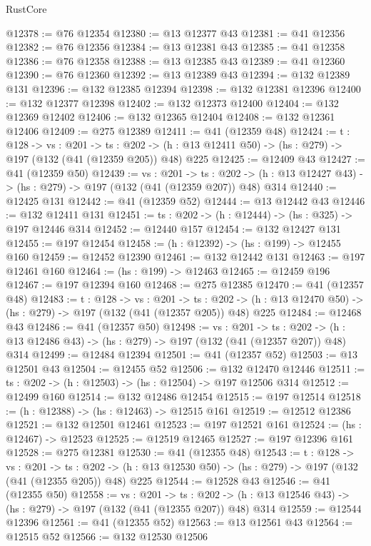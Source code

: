 \begin{lexlean}{RustCore}
\begin{coremodule}
@12378 := @76 @12354
@12380 := @13 @12377 @43
@12381 := @41 @12356
@12382 := @76 @12356
@12384 := @13 @12381 @43
@12385 := @41 @12358
@12386 := @76 @12358
@12388 := @13 @12385 @43
@12389 := @41 @12360
@12390 := @76 @12360
@12392 := @13 @12389 @43
@12394 := @132 @12389 @131
@12396 := @132 @12385 @12394
@12398 := @132 @12381 @12396
@12400 := @132 @12377 @12398
@12402 := @132 @12373 @12400
@12404 := @132 @12369 @12402
@12406 := @132 @12365 @12404
@12408 := @132 @12361 @12406
@12409 := @275 @12389
@12411 := @41 (@12359 @48)
@12424 := {t : @128} ->
  {vs : @201} ->
  {ts : @202} -> (h : @13 @12411 @50) -> (hs : @279) -> @197 (@132 (@41 (@12359 @205)) @48) @225
@12425 := @12409 @43
@12427 := @41 (@12359 @50)
@12439 := {vs : @201} ->
  {ts : @202} -> (h : @13 @12427 @43) -> (hs : @279) -> @197 (@132 (@41 (@12359 @207)) @48) @314
@12440 := @12425 @131
@12442 := @41 (@12359 @52)
@12444 := @13 @12442 @43
@12446 := @132 @12411 @131
@12451 := {ts : @202} -> (h : @12444) -> (hs : @325) -> @197 @12446 @314
@12452 := @12440 @157
@12454 := @132 @12427 @131
@12455 := @197 @12454
@12458 := (h : @12392) -> (hs : @199) -> @12455 @160
@12459 := @12452 @12390
@12461 := @132 @12442 @131
@12463 := @197 @12461 @160
@12464 := (hs : @199) -> @12463
@12465 := @12459 @196
@12467 := @197 @12394 @160
@12468 := @275 @12385
@12470 := @41 (@12357 @48)
@12483 := {t : @128} ->
  {vs : @201} ->
  {ts : @202} -> (h : @13 @12470 @50) -> (hs : @279) -> @197 (@132 (@41 (@12357 @205)) @48) @225
@12484 := @12468 @43
@12486 := @41 (@12357 @50)
@12498 := {vs : @201} ->
  {ts : @202} -> (h : @13 @12486 @43) -> (hs : @279) -> @197 (@132 (@41 (@12357 @207)) @48) @314
@12499 := @12484 @12394
@12501 := @41 (@12357 @52)
@12503 := @13 @12501 @43
@12504 := @12455 @52
@12506 := @132 @12470 @12446
@12511 := {ts : @202} -> (h : @12503) -> (hs : @12504) -> @197 @12506 @314
@12512 := @12499 @160
@12514 := @132 @12486 @12454
@12515 := @197 @12514
@12518 := (h : @12388) -> (hs : @12463) -> @12515 @161
@12519 := @12512 @12386
@12521 := @132 @12501 @12461
@12523 := @197 @12521 @161
@12524 := (hs : @12467) -> @12523
@12525 := @12519 @12465
@12527 := @197 @12396 @161
@12528 := @275 @12381
@12530 := @41 (@12355 @48)
@12543 := {t : @128} ->
  {vs : @201} ->
  {ts : @202} -> (h : @13 @12530 @50) -> (hs : @279) -> @197 (@132 (@41 (@12355 @205)) @48) @225
@12544 := @12528 @43
@12546 := @41 (@12355 @50)
@12558 := {vs : @201} ->
  {ts : @202} -> (h : @13 @12546 @43) -> (hs : @279) -> @197 (@132 (@41 (@12355 @207)) @48) @314
@12559 := @12544 @12396
@12561 := @41 (@12355 @52)
@12563 := @13 @12561 @43
@12564 := @12515 @52
@12566 := @132 @12530 @12506

\end{coremodule}
\end{lexlean}
